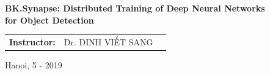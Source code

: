 \documentclass[a4paper,12pt]{report}
\begin{document}
\begin{center}
    {\fontsize{14}{18}\selectfont \textbf{BK.Synapse: Distributed Training of Deep Neural Networks\\ for Object Detection} }\\[0.9cm]
    
    \begin{table}[ht]
    \centering
    \label{my-label}
    \begin{tabular}{lll}
                   
    \textbf{Instructor:} & Dr. ĐINH VIẾT SANG\\
    
    \end{tabular}
    \end{table} 
    \vspace{4cm}
    \fontsize{12}{19}\selectfont Hanoi, 5 - 2019
\end{center}
\pagebreak


    
    
    
    
    
\end{document}
